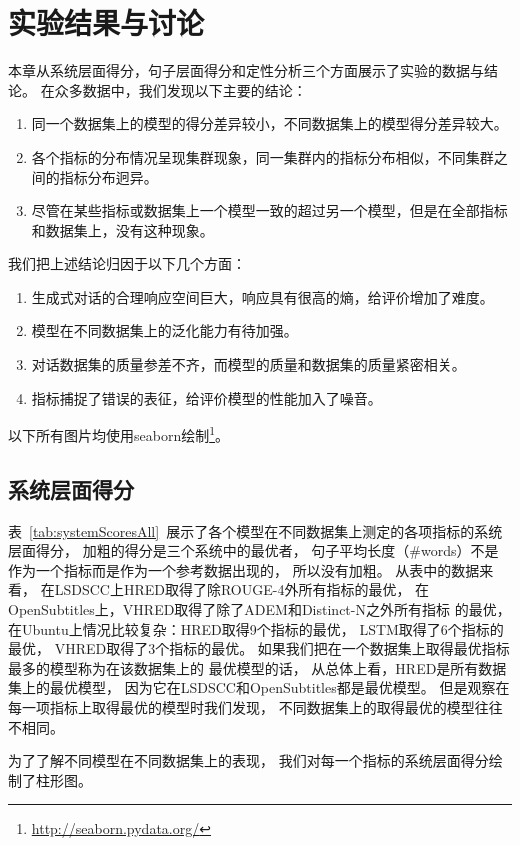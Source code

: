 
\chapter{实验结果与讨论}\label{ch:experiment}
本章从系统层面得分，句子层面得分和定性分析三个方面展示了实验的数据与结论。
在众多数据中，我们发现以下主要的结论：
\begin{enumerate}
    \item 同一个数据集上的模型的得分差异较小，不同数据集上的模型得分差异较大。
    \item 各个指标的分布情况呈现集群现象，同一集群内的指标分布相似，不同集群之间的指标分布迥异。
    \item 尽管在某些指标或数据集上一个模型一致的超过另一个模型，但是在全部指标和数据集上，没有这种现象。
\end{enumerate}
我们把上述结论归因于以下几个方面：
\begin{enumerate}
    \item 生成式对话的合理响应空间巨大，响应具有很高的熵，给评价增加了难度。
    \item 模型在不同数据集上的泛化能力有待加强。
    \item 对话数据集的质量参差不齐，而模型的质量和数据集的质量紧密相关。
    \item 指标捕捉了错误的表征，给评价模型的性能加入了噪音。
\end{enumerate}
以下所有图片均使用seaborn绘制\footnote{\url{http://seaborn.pydata.org/}}。

\section{系统层面得分}\label{sec:system_scores}
表~\ref{tab:systemScoresAll}~展示了各个模型在不同数据集上测定的各项指标的系统层面得分，
加粗的得分是三个系统中的最优者，
句子平均长度（\#words）不是作为一个指标而是作为一个参考数据出现的，
所以没有加粗。
从表中的数据来看，
在LSDSCC上HRED取得了除ROUGE-4外所有指标的最优，
在OpenSubtitles上，VHRED取得了除了ADEM和Distinct-N之外所有指标
的最优，
在Ubuntu上情况比较复杂：HRED取得9个指标的最优，
LSTM取得了6个指标的最优，
VHRED取得了3个指标的最优。
如果我们把在一个数据集上取得最优指标最多的模型称为在该数据集上的
最优模型的话，
从总体上看，HRED是所有数据集上的最优模型，
因为它在LSDSCC和OpenSubtitles都是最优模型。
但是观察在每一项指标上取得最优的模型时我们发现，
不同数据集上的取得最优的模型往往不相同。

为了了解不同模型在不同数据集上的表现，
我们对每一个指标的系统层面得分绘制了柱形图。


